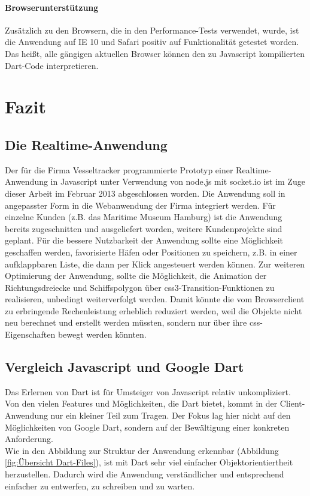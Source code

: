 \subsubsection{Browserunterstützung}
Zusätzlich zu den Browsern, die in den Performance-Tests verwendet, wurde, ist die Anwendung auf IE 10 und Safari positiv auf Funktionalität getestet worden. Das heißt, alle gängigen aktuellen Browser können den zu Javascript kompilierten Dart-Code interpretieren.

\chapter{Fazit}\label{Fazit}

\section{Die Realtime-Anwendung}
Der für die Firma Vesseltracker programmierte Prototyp einer Realtime-Anwendung in Javascript unter Verwendung von node.js mit socket.io ist im Zuge dieser Arbeit im Februar 2013 abgeschlossen worden. Die Anwendung soll in angepasster Form in die Webanwendung der Firma integriert werden. Für einzelne Kunden (z.B. das Maritime Museum Hamburg) ist die Anwendung bereits zugeschnitten und ausgeliefert worden, weitere Kundenprojekte sind geplant.
Für die bessere Nutzbarkeit der Anwendung sollte eine Möglichkeit geschaffen werden, favorisierte Häfen oder Positionen zu speichern, z.B. in einer aufklappbaren Liste, die dann per Klick angesteuert werden können.
Zur weiteren Optimierung der Anwendung, sollte die Möglichkeit, die Animation der Richtungsdreiecke und Schiffspolygon über css3-Transition-Funktionen zu realisieren, unbedingt weiterverfolgt werden. Damit könnte die vom Browserclient zu erbringende Rechenleistung erheblich reduziert werden, weil die Objekte nicht neu berechnet und erstellt werden müssten, sondern nur über ihre css-Eigenschaften bewegt werden könnten.

\section{Vergleich Javascript und Google Dart}
Das Erlernen von Dart ist für Umsteiger von Javascript relativ unkompliziert. Von den vielen Features und Möglichkeiten, die Dart bietet, kommt in der Client-Anwendung nur ein kleiner Teil zum Tragen. Der Fokus lag hier nicht auf den Möglichkeiten von Google Dart, sondern auf der Bewältigung einer konkreten Anforderung. \\
Wie in den Abbildung zur Struktur der Anwendung erkennbar (Abbildung \ref{fig:Übersicht Dart-Files}), ist mit Dart sehr viel einfacher Objektorientiertheit herzustellen. Dadurch wird die Anwendung verständlicher und entsprechend einfacher zu entwerfen, zu schreiben und zu warten.

